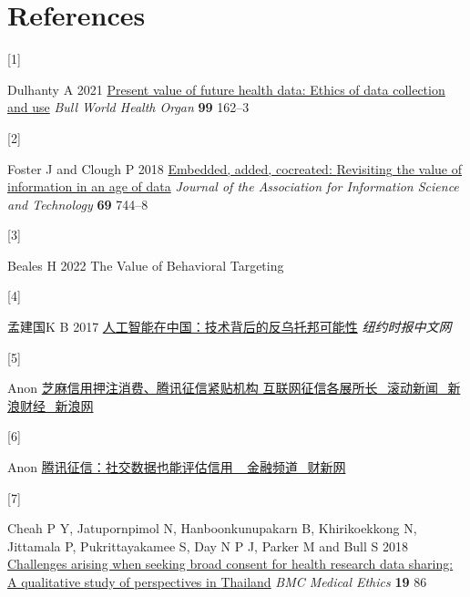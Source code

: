 \documentclass[
]{article}
\newlength{\cslhangindent}
\newlength{\csllabelwidth}
\newlength{\cslentryspacingunit} %
\newenvironment{CSLReferences}[2] %
 {%
  \setlength{\parindent}{0pt}
  \ifodd #1
  \let\oldpar\par
  \def\par{\hangindent=\cslhangindent\oldpar}
  \fi
  \setlength{\parskip}{#2\cslentryspacingunit}
 }%
 {}
\newcommand{\CSLLeftMargin}[1]{\parbox[t]{\csllabelwidth}{#1}}
\newcommand{\CSLRightInline}[1]{\parbox[t]{\linewidth - \csllabelwidth}{#1}\break}
\begin{document}
\hypertarget{references}{%
\section*{References}\label{references}}

\hypertarget{refs}{}
\begin{CSLReferences}{0}{0}
\leavevmode{}%
\CSLLeftMargin{{[}1{]} }%
\CSLRightInline{Dulhanty A 2021
\href{https://doi.org/10.2471/BLT.19.237248}{Present value of future
health data: Ethics of data collection and use} \emph{Bull World Health
Organ} \textbf{99} 162--3}

\leavevmode{}%
\CSLLeftMargin{{[}2{]} }%
\CSLRightInline{Foster J and Clough P 2018
\href{https://doi.org/10.1002/asi.23987}{Embedded, added, cocreated:
{Revisiting} the value of information in an age of data} \emph{Journal
of the Association for Information Science and Technology} \textbf{69}
744--8}

\leavevmode{}%
\CSLLeftMargin{{[}3{]} }%
\CSLRightInline{Beales H 2022 The {Value} of {Behavioral} {Targeting}}

\leavevmode{}%
\CSLLeftMargin{{[}4{]} }%
\CSLRightInline{孟建国K B 2017
\href{https://cn.nytimes.com/business/20171205/china-artificial-intelligence/}{人工智能在中国：技术背后的反乌托邦可能性}
\emph{纽约时报中文网}}

\leavevmode{}%
\CSLLeftMargin{{[}5{]} }%
\CSLRightInline{Anon
\href{http://finance.sina.com.cn/roll/20150825/080823054761.shtml}{芝麻信用押注消费、腾讯征信紧贴机构
互联网征信各展所长\_滚动新闻\_新浪财经\_新浪网}}

\leavevmode{}%
\CSLLeftMargin{{[}6{]} }%
\CSLRightInline{Anon
\href{https://finance.caixin.com/2015-07-21/100830962.html}{腾讯征信：社交数据也能评估信用
\_金融频道\_财新网}}

\leavevmode{}%
\CSLLeftMargin{{[}7{]} }%
\CSLRightInline{Cheah P Y, Jatupornpimol N, Hanboonkunupakarn B,
Khirikoekkong N, Jittamala P, Pukrittayakamee S, Day N P J, Parker M and
Bull S 2018 \href{https://doi.org/10.1186/s12910-018-0326-x}{Challenges
arising when seeking broad consent for health research data sharing: A
qualitative study of perspectives in {Thailand}} \emph{BMC Medical
Ethics} \textbf{19} 86}


\end{CSLReferences}
\end{document}
